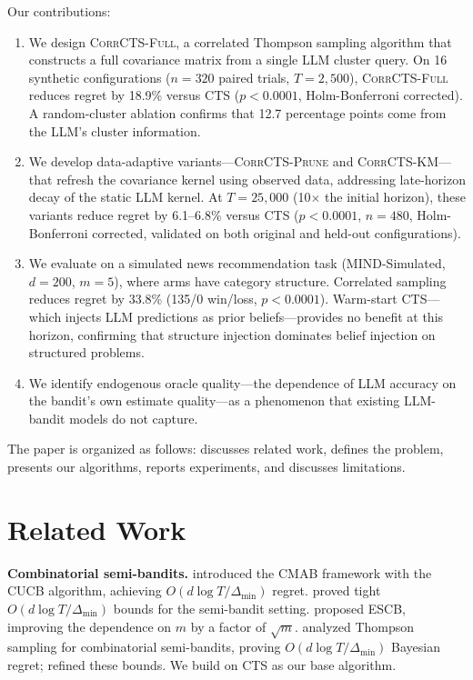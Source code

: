 \documentclass{article}
\theoremstyle{plain}
\theoremstyle{definition}
\theoremstyle{remark}
\newcommand{\gap}{\Delta_{\min}}
\newcommand{\CorrFull}{\textsc{CorrCTS-Full}}
\newcommand{\EdgePrune}{\textsc{CorrCTS-Prune}}
\newcommand{\KMRefine}{\textsc{CorrCTS-KM}}
\begin{document}
Our contributions:
\begin{enumerate}
\item We design \CorrFull{}, a correlated Thompson sampling algorithm that constructs a full covariance matrix from a single LLM cluster query. On 16 synthetic configurations ($n{=}320$ paired trials, $T{=}2{,}500$), \CorrFull{} reduces regret by 18.9\% versus CTS ($p < 0.0001$, Holm-Bonferroni corrected). A random-cluster ablation confirms that 12.7 percentage points come from the LLM's cluster information.
\item We develop data-adaptive variants---\EdgePrune{} and \KMRefine{}---that refresh the covariance kernel using observed data, addressing late-horizon decay of the static LLM kernel. At $T{=}25{,}000$ (10$\times$ the initial horizon), these variants reduce regret by 6.1--6.8\% versus CTS ($p < 0.0001$, $n{=}480$, Holm-Bonferroni corrected, validated on both original and held-out configurations).
\item We evaluate on a simulated news recommendation task (MIND-Simulated, $d{=}200$, $m{=}5$), where arms have category structure. Correlated sampling reduces regret by 33.8\% (135/0 win/loss, $p < 0.0001$). Warm-start CTS---which injects LLM predictions as prior beliefs---provides no benefit at this horizon, confirming that structure injection dominates belief injection on structured problems.
\item We identify endogenous oracle quality---the dependence of LLM accuracy on the bandit's own estimate quality---as a phenomenon that existing LLM-bandit models do not capture.
\end{enumerate}

The paper is organized as follows:  discusses related work,  defines the problem,  presents our algorithms,  reports experiments, and  discusses limitations.

\section{Related Work}\label{sec:related}

\textbf{Combinatorial semi-bandits.}
\citet{chen2013cucb} introduced the CMAB framework with the CUCB algorithm, achieving $O(d\log T / \gap)$ regret.
\citet{kveton2015tight} proved tight $O(d \log T / \gap)$ bounds for the semi-bandit setting.
\citet{combes2015combinatorial} proposed ESCB, improving the dependence on $m$ by a factor of $\sqrt{m}$.
\citet{wang2018cts} analyzed Thompson sampling for combinatorial semi-bandits, proving $O(d\log T / \gap)$ Bayesian regret; \citet{perrault2020statistical} refined these bounds.
We build on CTS as our base algorithm.
\end{document}
